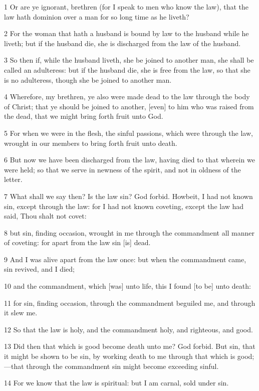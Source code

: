 \par 1 Or are ye ignorant, brethren (for I speak to men who know the law), that the law hath dominion over a man for so long time as he liveth?
\par 2 For the woman that hath a husband is bound by law to the husband while he liveth; but if the husband die, she is discharged from the law of the husband.
\par 3 So then if, while the husband liveth, she be joined to another man, she shall be called an adulteress: but if the husband die, she is free from the law, so that she is no adulteress, though she be joined to another man.
\par 4 Wherefore, my brethren, ye also were made dead to the law through the body of Christ; that ye should be joined to another, [even] to him who was raised from the dead, that we might bring forth fruit unto God.
\par 5 For when we were in the flesh, the sinful passions, which were through the law, wrought in our members to bring forth fruit unto death.
\par 6 But now we have been discharged from the law, having died to that wherein we were held; so that we serve in newness of the spirit, and not in oldness of the letter.
\par 7 What shall we say then? Is the law sin? God forbid. Howbeit, I had not known sin, except through the law: for I had not known coveting, except the law had said, Thou shalt not covet:
\par 8 but sin, finding occasion, wrought in me through the commandment all manner of coveting: for apart from the law sin [is] dead.
\par 9 And I was alive apart from the law once: but when the commandment came, sin revived, and I died;
\par 10 and the commandment, which [was] unto life, this I found [to be] unto death:
\par 11 for sin, finding occasion, through the commandment beguiled me, and through it slew me.
\par 12 So that the law is holy, and the commandment holy, and righteous, and good.
\par 13 Did then that which is good become death unto me? God forbid. But sin, that it might be shown to be sin, by working death to me through that which is good; —that through the commandment sin might become exceeding sinful.
\par 14 For we know that the law is spiritual: but I am carnal, sold under sin.
